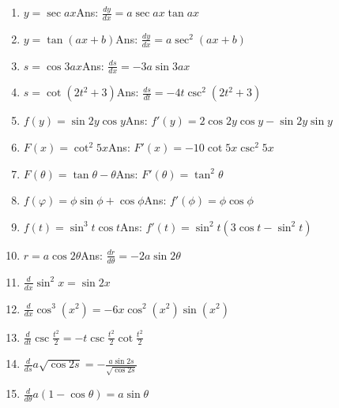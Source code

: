 \begin{enumerate}
\item
$y = \sec ax$\qquad\qquad\qquad\qquad\qquad\qquad Ans:  	$\frac{dy}{dx} =	a\sec ax\tan ax$

\item
$y = \tan(ax + b)$\qquad\qquad\qquad\qquad\qquad\qquad Ans:  	$\frac{dy}{dx} 	= a\sec^2(ax + b)$

\item
$s = \cos 3ax$\qquad\qquad\qquad\qquad\qquad\qquad Ans:  	$\frac{ds}{dx} 	= - 3a\sin 3ax$

\item
$ s = \cot(2t^2 + 3)$\qquad\qquad\qquad\qquad\qquad\qquad Ans:  	$\frac{ds}{dt} 	= - 4t\csc^2(2t^2 + 3)$

\item
$f(y) = \sin 2y\cos y$\qquad\qquad\qquad\qquad Ans:  	$f'(y) 	= 2\cos 2y\cos y - \sin 2y\sin y$

\item
$F(x) = \cot^2 5x$\qquad\qquad\qquad\qquad\qquad\qquad Ans:  	$F'(x) 	= - 10\cot 5x\csc^2 5x$

\item
$F(\theta ) = \tan \theta - \theta$\qquad\qquad\qquad\qquad\qquad\qquad Ans:  	$F'(\theta) 	= \tan^2 \theta$

\item
$f(φ) = \phi \sin\phi  + \cos\phi $\qquad\qquad\qquad\qquad\qquad\qquad Ans:  	$f'(\phi )	= \phi \cos \phi $

\item
$f(t) = \sin^3 t\cos t$\qquad\qquad\qquad\qquad Ans:  	$f'(t) 	= \sin^2 t(3\cos t - \sin^2 t)$

\item
$r = a\cos 2\theta$\qquad\qquad\qquad\qquad\qquad\qquad Ans:  	$\frac{dr}{d\theta} 	= - 2a\sin 2\theta$

\item
$\frac{d}{dx} \sin^2 x = \sin 2x$

\item
$\frac{d}{dx} \cos^3 (x^2) = -6x \cos^2 (x^2) \sin (x^2)$

\item
$\frac{d}{dt} \csc \frac{t^2}{2} = -t \csc \frac{t^2}{2} \cot \frac{t^2}{2}$

\item
$\frac{d}{ds} a \sqrt{\cos 2s} = -\frac{a \sin 2s}{\sqrt{\cos 2s}}$

\item
$\frac{d}{d\theta} a(1 - \cos \theta) = a \sin \theta$


\end{enumerate}
